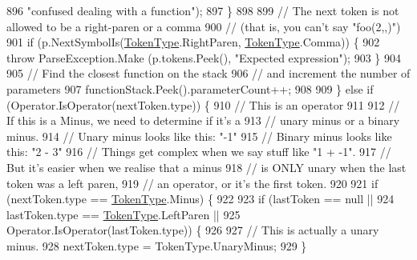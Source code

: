 \begin{DoxyCode}
896                                 \textcolor{stringliteral}{"confused dealing with a function"});
897                         \}
898 
899                         \textcolor{comment}{// The next token is not allowed to be a right-paren or a comma}
900                         \textcolor{comment}{// (that is, you can't say "foo(2,,)")}
901                         \textcolor{keywordflow}{if} (p.NextSymbolIs(\hyperlink{a00029_a301aa7c866593a5b625a8fc158bbeace}{TokenType}.RightParen, 
      \hyperlink{a00029_a301aa7c866593a5b625a8fc158bbeace}{TokenType}.Comma)) \{
902                             \textcolor{keywordflow}{throw} ParseException.Make (p.tokens.Peek(), \textcolor{stringliteral}{"Expected expression"});
903                         \}
904 
905                         \textcolor{comment}{// Find the closest function on the stack}
906                         \textcolor{comment}{// and increment the number of parameters}
907                         functionStack.Peek().parameterCount++;
908 
909                     \} \textcolor{keywordflow}{else} \textcolor{keywordflow}{if} (Operator.IsOperator(nextToken.type)) \{
910                         \textcolor{comment}{// This is an operator}
911 
912                         \textcolor{comment}{// If this is a Minus, we need to determine if it's a }
913                         \textcolor{comment}{// unary minus or a binary minus.}
914                         \textcolor{comment}{// Unary minus looks like this: "-1"}
915                         \textcolor{comment}{// Binary minus looks like this: "2 - 3"}
916                         \textcolor{comment}{// Things get complex when we say stuff like "1 + -1".}
917                         \textcolor{comment}{// But it's easier when we realise that a minus}
918                         \textcolor{comment}{// is ONLY unary when the last token was a left paren,}
919                         \textcolor{comment}{// an operator, or it's the first token.}
920 
921                         \textcolor{keywordflow}{if} (nextToken.type == \hyperlink{a00029_a301aa7c866593a5b625a8fc158bbeace}{TokenType}.Minus) \{
922 
923                             \textcolor{keywordflow}{if} (lastToken == null || 
924                                 lastToken.type == \hyperlink{a00029_a301aa7c866593a5b625a8fc158bbeace}{TokenType}.LeftParen ||
925                                 Operator.IsOperator(lastToken.type)) \{
926 
927                                 \textcolor{comment}{// This is actually a unary minus.}
928                                 nextToken.type = TokenType.UnaryMinus;
929                             \}

\end{DoxyCode}

